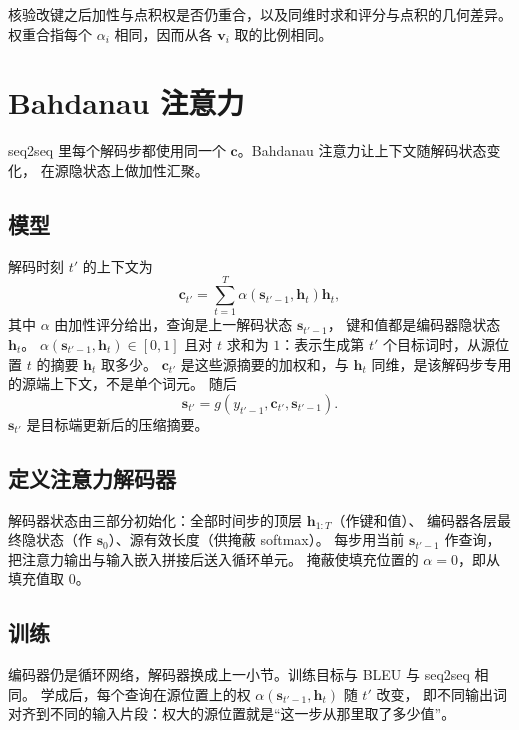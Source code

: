 核验改键之后加性与点积权是否仍重合，以及同维时求和评分与点积的几何差异。
权重合指每个 $\alpha_i$ 相同，因而从各 $\bm{v}_i$ 取的比例相同。

\section{Bahdanau 注意力}



seq2seq 里每个解码步都使用同一个 $\bm{c}$。Bahdanau 注意力让上下文随解码状态变化，
在源隐状态上做加性汇聚。

\subsection{模型}

解码时刻 $t'$ 的上下文为
\[
\bm{c}_{t'}
=
\sum_{t=1}^{T}\alpha(\bm{s}_{t'-1},\bm{h}_t)\bm{h}_t,
\]
其中 $\alpha$ 由加性评分给出，查询是上一解码状态 $\bm{s}_{t'-1}$，
键和值都是编码器隐状态 $\bm{h}_t$。
$\alpha(\bm{s}_{t'-1},\bm{h}_t)\in[0,1]$ 且对 $t$ 求和为 $1$：表示生成第 $t'$ 个目标词时，从源位置 $t$ 的摘要 $\bm{h}_t$ 取多少。
$\bm{c}_{t'}$ 是这些源摘要的加权和，与 $\bm{h}_t$ 同维，是该解码步专用的源端上下文，不是单个词元。
随后
\[
\bm{s}_{t'}=g(y_{t'-1},\bm{c}_{t'},\bm{s}_{t'-1}).
\]
$\bm{s}_{t'}$ 是目标端更新后的压缩摘要。

\subsection{定义注意力解码器}

解码器状态由三部分初始化：全部时间步的顶层 $\bm{h}_{1:T}$（作键和值）、
编码器各层最终隐状态（作 $\bm{s}_0$）、源有效长度（供掩蔽 softmax）。
每步用当前 $\bm{s}_{t'-1}$ 作查询，把注意力输出与输入嵌入拼接后送入循环单元。
掩蔽使填充位置的 $\alpha=0$，即从填充值取 $0$。

\subsection{训练}

编码器仍是循环网络，解码器换成上一小节。训练目标与 BLEU 与 seq2seq 相同。
学成后，每个查询在源位置上的权 $\alpha(\bm{s}_{t'-1},\bm{h}_t)$ 随 $t'$ 改变，
即不同输出词对齐到不同的输入片段：权大的源位置就是“这一步从那里取了多少值”。

